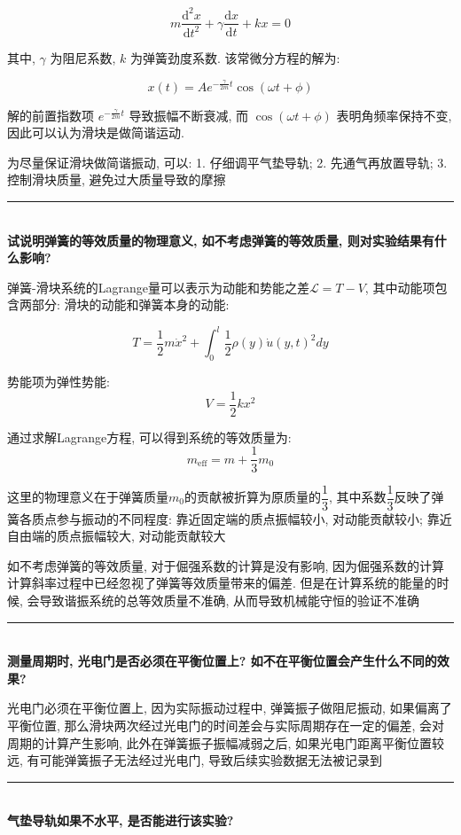 \documentclass[zihao=5, UTF8]{article}
\renewcommand{\dd}{\mathrm{d}}
\theoremstyle{MyLineTheoremStyle} %
\theoremstyle{MyBlockTheoremStyle} %
\theoremstyle{MySubsubsectionStyle} %
\begin{document}
\begin{equation}
m\frac{\dd^2x}{\dd t^2} + \gamma\frac{\dd x}{\dd t} + kx = 0
\end{equation}

其中, $\gamma$ 为阻尼系数, $k$ 为弹簧劲度系数. 该常微分方程的解为: 

\begin{equation}
x(t) = A e^{-\frac{\gamma}{2m}t} \cos(\omega t + \phi)
\end{equation}

解的前置指数项 $e^{-\frac{\gamma}{2m}t}$ 导致振幅不断衰减, 
而 $\cos(\omega t + \phi)$ 表明角频率保持不变, 因此可以认为滑块是做简谐运动. 

为尽量保证滑块做简谐振动, 可以: 1. 仔细调平气垫导轨; 2. 先通气再放置导轨; 3. 控制滑块质量, 避免过大质量导致的摩擦
~\\
\hrule
~\\
\textbf{试说明弹簧的等效质量的物理意义, 如不考虑弹簧的等效质量, 则对实验结果有什么影响?}

弹簧-滑块系统的Lagrange量可以表示为动能和势能之差$\mathcal L = T - V$, 
其中动能项包含两部分: 滑块的动能和弹簧本身的动能: 

\begin{equation}
T = \frac{1}{2}m\dot{x}^2 + \int_0^l \frac{1}{2}\rho(y)\dot{u}(y,t)^2dy
\end{equation}

势能项为弹性势能: 
\begin{equation}
V = \frac{1}{2}kx^2 
\end{equation}

通过求解Lagrange方程, 可以得到系统的等效质量为: 
\begin{equation}
m_{\text{eff}} = m + \frac{1}{3}m_0
\end{equation}

这里的物理意义在于弹簧质量$m_0$的贡献被折算为原质量的$\dfrac{1}{3}$,
其中系数$\dfrac{1}{3}$反映了弹簧各质点参与振动的不同程度:
靠近固定端的质点振幅较小, 对动能贡献较小;
靠近自由端的质点振幅较大, 对动能贡献较大

如不考虑弹簧的等效质量, 对于倔强系数的计算是没有影响, 
因为倔强系数的计算计算斜率过程中已经忽视了弹簧等效质量带来的偏差.
但是在计算系统的能量的时候, 会导致谐振系统的总等效质量不准确, 
从而导致机械能守恒的验证不准确
~\\
\hrule
~\\
\textbf{测量周期时, 光电门是否必须在平衡位置上? 如不在平衡位置会产生什么不同的效果? }

光电门必须在平衡位置上, 因为实际振动过程中, 弹簧振子做阻尼振动, 
如果偏离了平衡位置, 那么滑块两次经过光电门的时间差会与实际周期存在一定的偏差, 
会对周期的计算产生影响, 此外在弹簧振子振幅减弱之后, 
如果光电门距离平衡位置较远, 有可能弹簧振子无法经过光电门, 导致后续实验数据无法被记录到
~\\
\hrule
~\\
\textbf{气垫导轨如果不水平, 是否能进行该实验?}
\end{document}
